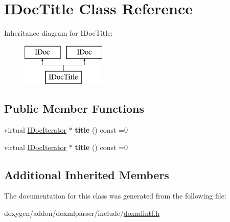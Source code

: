 \hypertarget{class_i_doc_title}{}\section{I\+Doc\+Title Class Reference}
\label{class_i_doc_title}
Inheritance diagram for I\+Doc\+Title\+:\begin{figure}[H]
\begin{center}
\leavevmode
\includegraphics[height=2.000000cm]{class_i_doc_title}
\end{center}
\end{figure}
\subsection*{Public Member Functions}
\begin{DoxyCompactItemize}
\item 
\mbox{\label{class_i_doc_title_a7fba41af41829b3b839d75c7719252ea}} 
virtual \mbox{\hyperlink{class_i_doc_iterator}{I\+Doc\+Iterator}} $\ast$ {\bfseries title} () const =0
\item 
\mbox{\label{class_i_doc_title_a7fba41af41829b3b839d75c7719252ea}} 
virtual \mbox{\hyperlink{class_i_doc_iterator}{I\+Doc\+Iterator}} $\ast$ {\bfseries title} () const =0
\end{DoxyCompactItemize}
\subsection*{Additional Inherited Members}


The documentation for this class was generated from the following file\+:\begin{DoxyCompactItemize}
\item 
doxygen/addon/doxmlparser/include/\mbox{\hyperlink{include_2doxmlintf_8h}{doxmlintf.\+h}}\end{DoxyCompactItemize}

